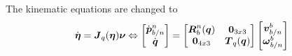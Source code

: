 The kinematic equations are changed to 
\begin{equation}
\dot{\boldsymbol{\eta}} = \boldsymbol{J}_q(\boldsymbol{\eta})\boldsymbol{\nu}
\Leftrightarrow
\begin{bmatrix}
\dot{\boldsymbol{p}}^n_{b/n} \\
\dot{\boldsymbol{q}}
\end{bmatrix}
=
\begin{bmatrix}
\boldsymbol{R}^n_b(\boldsymbol{q}) & \boldsymbol{0}_{3x3} \\
\boldsymbol{0}_{4x3} & \boldsymbol{T}_q(\boldsymbol{q})
\end{bmatrix}
\begin{bmatrix}
\boldsymbol{v}^b_{b/n} \\
\boldsymbol{\omega}^b_{b/n}
\end{bmatrix}
\end{equation}  